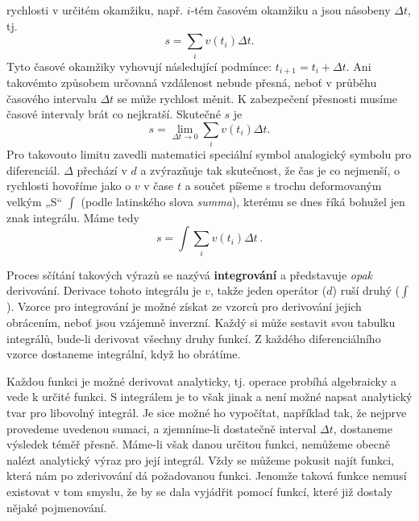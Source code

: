 {    rychlosti v určitém okamžiku, např. \(i\)-tém časovém okamžiku a jsou násobeny \(\Delta t\), tj.
    \begin{equation}\label{FYZ:eq123}
      s = \sum_{i}v(t_i)\Delta t.
    \end{equation}
    Tyto časové okamžiky vyhovují následující podmínce: \(t_{i+1} = t_i + \Delta t\). Ani takovémto 
    způsobem určovaná vzdálenost nebude přesná, neboť v průběhu časového intervalu \(\Delta t\) se 
    může rychlost měnit. K zabezpečení přesnosti musíme časové intervaly brát co nejkratší. 
    Skutečné \(s\) je
    \begin{equation}\label{FYZ:eq124}
      s = \lim_{\Delta t\to0}\sum_{i}v(t_i)\Delta t.
    \end{equation}
    Pro takovouto limitu zavedli matematici speciální symbol analogický symbolu pro diferenciál.    
    \(\Delta\) přechází v \(d\) a zvýrazňuje tak skutečnost, že čas je co nejmenší, o rychlosti 
    hovoříme jako o \(v\) v čase \(t\) a součet píšeme s trochu deformovaným velkým „S“ \(\int\) 
    (podle latinského slova \emph{summa}), kterému se dnes říká bohužel jen znak integrálu. Máme 
    tedy
    \begin{equation}\label{FYZ:eq125}
      \boxed{s = \int\sum_{i}v(t_i)\Delta t}\,.
    \end{equation}
    
    Proces sčítání takových výrazů se nazývá \textbf{integrování} a představuje \emph{opak} 
    derivování. Derivace tohoto integrálu je \(v\), takže jeden operátor (\(d\)) ruší druhý 
    (\(\int\)). Vzorce pro integrování je možné získat ze vzorců pro derivování jejich obrácením, 
    neboť jsou vzájemně inverzní. Každý si může sestavit svou tabulku integrálů, bude-li derivovat 
    všechny druhy funkcí. Z každého diferenciálního vzorce dostaneme integrální, když ho obrátíme.
    
    Každou funkci je možné derivovat analyticky, tj. operace probíhá algebraicky a vede k určité 
    funkci. S integrálem je to však jinak a není možné napsat analytický tvar pro libovolný 
    integrál. Je sice možné ho vypočítat, například tak, že nejprve provedeme uvedenou sumaci, a 
    zjemníme-li dostatečně interval \(\Delta t\), dostaneme výsledek téměř přesně. Máme-li však 
    danou určitou funkci, nemůžeme obecně nalézt analytický výraz pro její integrál. Vždy se můžeme 
    pokusit najít funkci, která nám po zderivování dá požadovanou funkci. Jenomže taková funkce 
    nemusí existovat v tom smyslu, že by se dala vyjádřit pomocí funkcí, které již dostaly nějaké 
    pojmenování.
    
}

